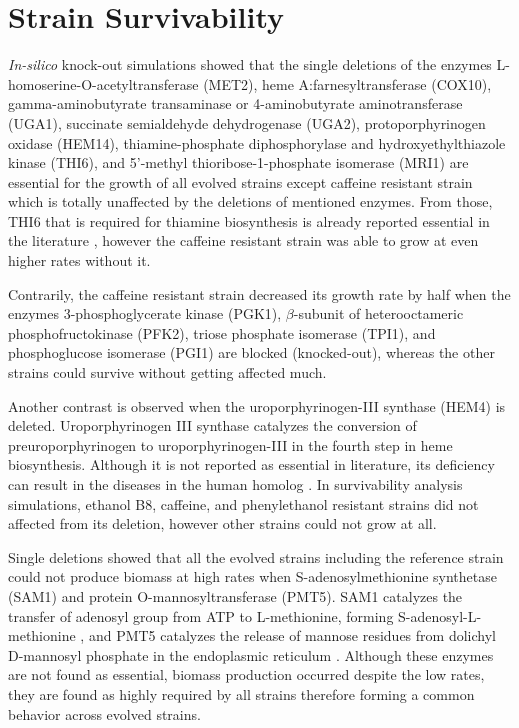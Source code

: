 \section{Strain Survivability}
\emph{In-silico} knock-out simulations showed that the single deletions of the enzymes L-homoserine-O-acetyltransferase (MET2), heme A:farnesyltransferase (COX10), gamma-aminobutyrate transaminase or 4-aminobutyrate aminotransferase (UGA1), succinate semialdehyde dehydrogenase (UGA2), protoporphyrinogen oxidase (HEM14), thiamine-phosphate diphosphorylase and hydroxyethylthiazole kinase (THI6), and 5'-methyl thioribose-1-phosphate isomerase (MRI1) are essential for the growth of all evolved strains except caffeine resistant strain which is totally unaffected by the deletions of mentioned enzymes. From those, THI6 that is required for thiamine biosynthesis is already reported essential in the literature \cite{nosaka1994isolation}, however the caffeine resistant strain was able to grow at even higher rates without it.

Contrarily, the caffeine resistant strain decreased its growth rate by half when the enzymes 3-phosphoglycerate kinase (PGK1), $\beta $-subunit of heterooctameric phosphofructokinase (PFK2), triose phosphate isomerase (TPI1), and phosphoglucose isomerase (PGI1) are blocked (knocked-out), whereas the other strains could survive without getting affected much.

Another contrast is observed when the uroporphyrinogen-III synthase (HEM4) is deleted. Uroporphyrinogen III synthase catalyzes the conversion of preuroporphyrinogen to uroporphyrinogen-III in the fourth step in heme biosynthesis\cite{amillet1995isolation}. Although it is not reported as essential in literature, its deficiency can result in the diseases in the human homolog \cite{tan2008identification}. In survivability analysis simulations, ethanol B8, caffeine, and phenylethanol resistant strains did not affected from its deletion, however other strains could not grow at all.

Single deletions showed that all the evolved strains including the reference strain could not produce biomass at high rates when S-adenosylmethionine synthetase (SAM1) and protein O-mannosyltransferase (PMT5). SAM1 catalyzes the transfer of adenosyl group from ATP to L-methionine, forming S-adenosyl-L-methionine \cite{chiang1977activation}, and PMT5 catalyzes the release of mannose residues from dolichyl D-mannosyl phosphate in the endoplasmic reticulum \cite{girrbach2003members}. Although these enzymes are not found as essential, biomass production occurred despite the low rates, they are found as highly required by all strains therefore forming a common behavior across evolved strains.

